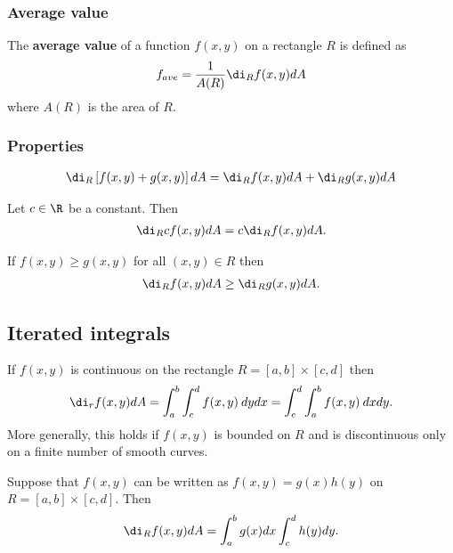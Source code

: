 \documentclass{article}
\begin{document}
\subsubsection{Average value}


\begin{definition}
	The \textbf{average value} of a function $f(x,y)$ on a rectangle $R$
	is defined as
	\begin{align*}
		f_{ave} = \frac{1}{A(R)}\di_R f(x,y)dA
	\end{align*}
	where $A(R)$ is the area of $R$.
\end{definition}


\subsubsection{Properties}


\begin{theorem}
	\begin{align*}
		\di_R\left[f(x,y)+g(x,y)\right]dA = \di_R f(x,y)dA + \di_R g(x,y)dA
	\end{align*}
\end{theorem}
\begin{theorem}
	Let $c\in\R$ be a constant. Then
	\begin{align*}
		\di_R cf(x,y)dA = c\di_R f(x,y)dA.
	\end{align*}
\end{theorem}
\begin{theorem}
	If $f(x,y)\geq g(x,y)$ for all $(x,y)\in R$ then
	\begin{align*}
		\di_R f(x,y)dA \geq \di_R g(x,y) dA.
	\end{align*}
\end{theorem}

\subsection{Iterated integrals}

\begin{theorem}
	If $f(x,y)$ is continuous on the rectangle $R=[a,b]\times[c,d]$ then
	\begin{align*}
		\di_r f(x,y)dA = \int_a^b \int_c^d f(x,y)\:dydx
		= \int_c^d \int_a^b f(x,y)\:dxdy.
	\end{align*}
	More generally, this holds if $f(x,y)$ is bounded on $R$ and is
	discontinuous only on a finite number of smooth curves.
\end{theorem}
\begin{lemma}
	Suppose that $f(x,y)$ can be written as $f(x,y)=g(x)h(y)$
	on $R=[a,b]\times[c,d]$. Then
	\begin{align*}
		\di_R f(x,y)dA = \int_a^b g(x)dx \int_c^d h(y)dy.
	\end{align*}
\end{lemma}
\end{document}
